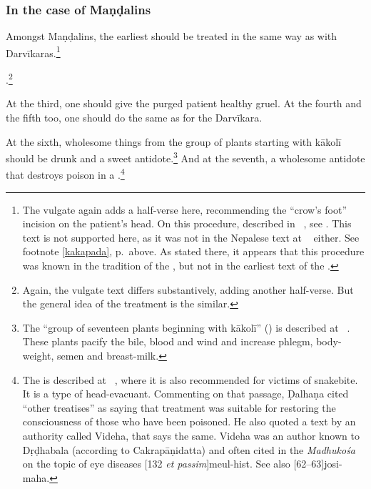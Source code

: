 \begin{translation}
\subsubsection{In the case of Maṇḍalins}

\item [24] Amongst Maṇḍalins, the earliest 
should be treated in the same way as with
Darvīkaras.\footnote{\label{crowsfoot}The vulgate again adds a half-verse
    here, recommending the “crow's foot” incision on the patient's head. On
    this procedure, described in  \CS\ , see
    \cite[145]{wuja-2003}. This text is not supported here, as it was not in
    the Nepalese text at \SS\  either. See footnote
    \ref{kakapada}, p.\,\pageref{kakapada} above.  As stated there, it
    appears that this procedure was known in the tradition of the \CS, but
    not in the earliest text of the \SS.}
    
\item [25]

.\footnote{Again, the vulgate text differs substantively, adding 
another half-verse.  But the general idea of the treatment is the 
similar.}

\item [26]

At the third, one should give the purged patient healthy gruel. At the fourth and 
the fifth too, one should do the same as for the Darvīkara.

\item [27]

At the sixth, wholesome things from the group of plants starting with
\gls{kākolī} should be drunk and a sweet
antidote.\footnote{\label{kākolyādi}The “group of seventeen plants
    beginning with \gls{kākolī}” () is described at
    \SS\ . These plants pacify the bile, blood and
    wind and increase phlegm, body-weight, semen and breast-milk.} And at
    the seventh, a wholesome antidote that destroys poison in a
    .\footnote{The  is described at
        \SS\ , where it is also recommended for victims
        of snakebite.  It is a type of head-evacuant. Commenting on that
        passage, Ḍalhaṇa cited “other treatises” as saying that 
        treatment was suitable for restoring the consciousness of those who
        have been poisoned.  He also quoted a text by an authority called
        Videha, that says the same.  \label{Videha}Videha was an author known
        to Dṛḍhabala (according to Cakrapāṇidatta) and often cited in the
        \emph{Madhukośa} on the topic of eye diseases [132
        \emph{et passim}]{meul-hist}. See also
        [62--63]{josi-maha}.}


\end{translation}
